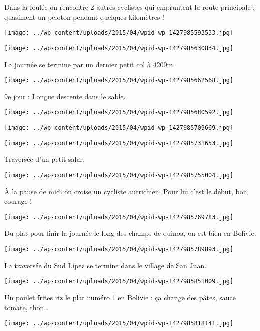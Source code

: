  Dans la foulée on rencontre 2 autres cyclistes qui empruntent la route principale : quasiment un peloton pendant quelques kilomètres ! \newline
 \newline
\centerline{\texttt{[image: ../wp-content/uploads/2015/04/wpid-wp-1427985593533.jpg]} } 
 \newline
 \newline
\centerline{\texttt{[image: ../wp-content/uploads/2015/04/wpid-wp-1427985630834.jpg]} } 
 \newline
 La journée se termine par un dernier petit col à 4200m. \newline
 \newline
\centerline{\texttt{[image: ../wp-content/uploads/2015/04/wpid-wp-1427985662568.jpg]} } 
 \newline
 9e jour : \newline
 Longue descente dans le sable. \newline
 \newline
\centerline{\texttt{[image: ../wp-content/uploads/2015/04/wpid-wp-1427985680592.jpg]} } 
 \newline
 \newline
\centerline{\texttt{[image: ../wp-content/uploads/2015/04/wpid-wp-1427985709669.jpg]} } 
 \newline
 \newline
\centerline{\texttt{[image: ../wp-content/uploads/2015/04/wpid-wp-1427985731653.jpg]} } 
 \newline
 Traversée d'un petit salar. \newline
 \newline
\centerline{\texttt{[image: ../wp-content/uploads/2015/04/wpid-wp-1427985755004.jpg]} } 
 \newline
 À la pause de midi on croise un cycliste autrichien. Pour lui c'est le début, bon courage ! \newline
 \newline
\centerline{\texttt{[image: ../wp-content/uploads/2015/04/wpid-wp-1427985769783.jpg]} } 
 \newline
 Du plat pour finir la journée le long des champs de quinoa, on est bien en Bolivie. \newline
 \newline
\centerline{\texttt{[image: ../wp-content/uploads/2015/04/wpid-wp-1427985789893.jpg]} } 
 \newline
 La traversée du Sud Lipez se termine dans le village de San Juan. \newline
 \newline
\centerline{\texttt{[image: ../wp-content/uploads/2015/04/wpid-wp-1427985851009.jpg]} } 
 \newline
 Un poulet frites riz le plat numéro 1 en Bolivie : ça change des pâtes, sauce tomate, thon… \newline
 \newline
\centerline{\texttt{[image: ../wp-content/uploads/2015/04/wpid-wp-1427985818141.jpg]} } 
 \newline

\newpage
 
